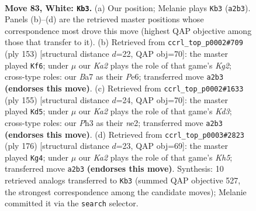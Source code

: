 \documentclass[11pt]{article}
\begin{document}
\clearpage

\begin{figure}[p]\centering
\begin{subfigure}{0.46\textwidth}\centering
\resizebox{\linewidth}{!}{%
\newchessgame
\chessboard[
  setfen={6k1/B1R5/8/8/r3p2p/5p1P/K4P2/8 w - - 0 83},
  showmover=false,
  pgfstyle=straightmove, color=movearrow, markmove={a2-b3}
]}
\caption{}
\end{subfigure}\hfill
\begin{subfigure}{0.46\textwidth}\centering
\resizebox{\linewidth}{!}{%
\newchessgame
\chessboard[
  setfen={8/4R1k1/r3p3/5p2/5P2/6P1/8/5K2 b - - 13 77},
  showmover=false,
  pgfstyle=straightmove, color=movearrow, markmove={g7-f6}
]}
\caption{}
\end{subfigure}
\\[4pt]
\begin{subfigure}{0.46\textwidth}\centering
\resizebox{\linewidth}{!}{%
\newchessgame
\chessboard[
  setfen={8/8/1R1k2p1/6P1/2r2P2/4K3/2b1N3/8 b - - 4 78},
  showmover=false,
  pgfstyle=straightmove, color=movearrow, markmove={d6-d5}
]}
\caption{}
\end{subfigure}\hfill
\begin{subfigure}{0.46\textwidth}\centering
\resizebox{\linewidth}{!}{%
\newchessgame
\chessboard[
  setfen={3R4/8/3Bpk2/1p2p2K/4Pp2/7r/8/8 w - - 5 89},
  showmover=false,
  pgfstyle=straightmove, color=movearrow, markmove={h5-g4}
]}
\caption{}
\end{subfigure}
\caption{\textbf{Move 83, White: \texttt{Kb3}.} (a) Our position; Melanie plays \texttt{Kb3} (\texttt{a2b3}). Panels (b)--(d) are the retrieved master positions whose correspondence most drove this move (highest QAP objective among those that transfer to it). (b) Retrieved from \texttt{ccrl\_top\_p0002\#709} (ply 153) [structural distance $d$=22, QAP obj=70]: the master played \texttt{Kf6}; under $\mu$ our \emph{Ka2} plays the role of that game's \emph{Kg2}; cross-type roles: our \emph{B}a7 as their \emph{P}e6; transferred move \texttt{a2b3} \textbf{(endorses this move)}. (c) Retrieved from \texttt{ccrl\_top\_p0002\#1633} (ply 155) [structural distance $d$=24, QAP obj=70]: the master played \texttt{Kd5}; under $\mu$ our \emph{Ka2} plays the role of that game's \emph{Kd3}; cross-type roles: our \emph{P}h3 as their \emph{n}e2; transferred move \texttt{a2b3} \textbf{(endorses this move)}. (d) Retrieved from \texttt{ccrl\_top\_p0003\#2823} (ply 176) [structural distance $d$=23, QAP obj=69]: the master played \texttt{Kg4}; under $\mu$ our \emph{Ka2} plays the role of that game's \emph{Kh5}; transferred move \texttt{a2b3} \textbf{(endorses this move)}. Synthesis: 10 retrieved analogs transferred to \texttt{Kb3} (summed QAP objective 527, the strongest correspondence among the candidate moves); Melanie committed it via the \texttt{search} selector.}
\label{fig:thought-m164}
\end{figure}
\end{document}
